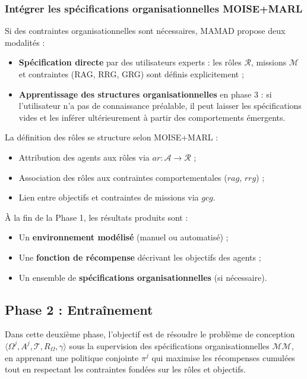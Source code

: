 \documentclass[pdflatex,sn-mathphys-num]{sn-jnl}%
\theoremstyle{thmstyleone}%
\theoremstyle{thmstyletwo}%
\theoremstyle{thmstylethree}%
\begin{document}
\subsubsection{Intégrer les spécifications organisationnelles MOISE+MARL}

Si des contraintes organisationnelles sont nécessaires, MAMAD propose deux modalités :
\begin{itemize}
    \item \textbf{Spécification directe} par des utilisateurs experts : les rôles $\mathcal{R}$, missions $\mathcal{M}$ et contraintes (RAG, RRG, GRG) sont définis explicitement ;
          
    \item \textbf{Apprentissage des structures organisationnelles} en phase 3 : si l'utilisateur n'a pas de connaissance préalable, il peut laisser les spécifications vides et les inférer ultérieurement à partir des comportements émergents.
\end{itemize}

La définition des rôles se structure selon MOISE+MARL :
\begin{itemize}
    \item Attribution des agents aux rôles via $ar: \mathcal{A} \to \mathcal{R}$ ;
    \item Association des rôles aux contraintes comportementales ($rag$, $rrg$) ;
    \item Lien entre objectifs et contraintes de missions via $gcg$.
\end{itemize}

\vspace{0.4em}
\noindent À la fin de la Phase 1, les résultats produits sont :
\begin{itemize}
    \item Un \textbf{environnement modélisé} (manuel ou automatisé) ;
    \item Une \textbf{fonction de récompense} décrivant les objectifs des agents ;
    \item Un ensemble de \textbf{spécifications organisationnelles} (si nécessaire).
\end{itemize}


\subsection{Phase 2 : Entraînement}

Dans cette deuxième phase, l'objectif est de résoudre le problème de conception $\langle \Omega^j, A^j, \mathcal{T}, R_{\Omega}, \gamma \rangle$ sous la supervision des spécifications organisationnelles $\mathcal{MM}$, en apprenant une politique conjointe $\pi^j$ qui maximise les récompenses cumulées tout en respectant les contraintes fondées sur les rôles et objectifs.
\end{document}
